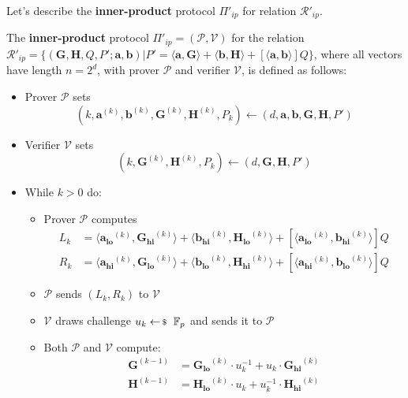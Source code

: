 \documentclass[../lecture-notes-148x210.tex]{subfiles}
\begin{document}
Let's describe the \textbf{inner-product} protocol $\Pi'_{ip}$ for relation $\mathcal{R}'_{ip}$. 
\begin{definition}
    The \textbf{inner-product} protocol $\Pi'_{ip} = (\mathcal{P}, \mathcal{V})$ for the relation $\mathcal{R}'_{ip} = \{ (\mathbf{G,H}, Q, P'; \mathbf{a,b}) \vert P' = \langle \mathbf{a,G} \rangle + \langle \mathbf{b,H} \rangle + [\langle \mathbf{a,b} \rangle]Q \}$, where all vectors have length $n=2^d$, with prover $\mathcal{P}$ and verifier $\mathcal{V}$, is defined as follows:
    \begin{itemize}
        \item Prover $\mathcal{P}$ sets $$(k, \mathbf{a}^{(k)}, \mathbf{b}^{(k)}, \mathbf{G}^{(k)}, \mathbf{H}^{(k)}, P_k) \gets (d, \mathbf{a,b,G,H},P')$$
        \item Verifier $\mathcal{V}$ sets $$(k, \mathbf{G}^{(k)}, \mathbf{H}^{(k)}, P_k) \gets (d, \mathbf{G,H},P')$$
        \item While $k > 0$ do:
            \begin{itemize}
                \item Prover $\mathcal{P}$ computes 
                    \begin{align*}
                        L_{k} &= \langle \mathbf{a_{lo}}^{(k)}, \mathbf{G_{hi}}^{(k)}\rangle + \langle \mathbf{b_{hi}}^{(k)}, \mathbf{H_{lo}}^{(k)}\rangle + [\langle \mathbf{a_{lo}}^{(k)}, \mathbf{b_{hi}}^{(k)}\rangle]Q \\
                        R_{k} &= \langle \mathbf{a_{hi}}^{(k)}, \mathbf{G_{lo}}^{(k)}\rangle + \langle \mathbf{b_{lo}}^{(k)}, \mathbf{H_{hi}}^{(k)}\rangle + [\langle \mathbf{a_{hi}}^{(k)}, \mathbf{b_{lo}}^{(k)}\rangle]Q
                    \end{align*}
                \item $\mathcal{P}$ sends $(L_k, R_k)$ to $\mathcal{V}$
                \item $\mathcal{V}$ draws challenge $u_k \leftarrowS \mathbb{F}_p$ and sends it to $\mathcal{P}$
                \item Both $\mathcal{P}$ and $\mathcal{V}$ compute:
                    \begin{align*}
                        \mathbf{G}^{(k-1)} &= \mathbf{G_{lo}}^{(k)} \cdot u_k^{-1} + u_k \cdot \mathbf{G_{hi}}^{(k)} \\
                        \mathbf{H}^{(k-1)} &= \mathbf{H_{lo}}^{(k)} \cdot u_k + u_k^{-1} \cdot \mathbf{H_{hi}}^{(k)}
                    \end{align*}

\end{itemize}
\end{itemize}
\end{definition}
\end{document}
